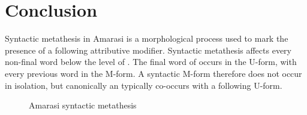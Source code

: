\section{Conclusion}
Syntactic metathesis in Amarasi is a morphological process
used to mark the presence of a following attributive modifier.
Syntactic metathesis affects every non-final word below the level of .
The final word of  occurs in the U-form,
with every previous word in the M-form.
A syntactic M-form therefore does not occur in isolation,
but canonically an typically co-occurs with a following U-form.


\begin{figure}[h]
	\caption{Amarasi syntactic metathesis}\label{fig:AmaSynMet}
\end{figure}